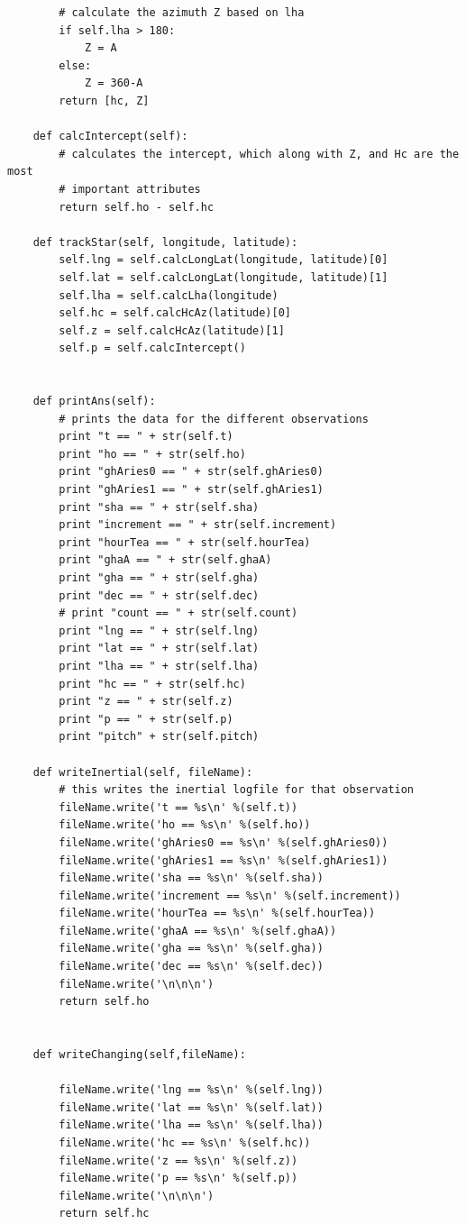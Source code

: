 \documentclass[12pt,a4paper]{book}
\begin{document}
\begin{appendices}
\begin{verbatim}
        # calculate the azimuth Z based on lha
        if self.lha > 180:
            Z = A
        else:
            Z = 360-A
        return [hc, Z]

    def calcIntercept(self):
        # calculates the intercept, which along with Z, and Hc are the most 
        # important attributes
        return self.ho - self.hc

    def trackStar(self, longitude, latitude):
        self.lng = self.calcLongLat(longitude, latitude)[0]
        self.lat = self.calcLongLat(longitude, latitude)[1]
        self.lha = self.calcLha(longitude)
        self.hc = self.calcHcAz(latitude)[0]
        self.z = self.calcHcAz(latitude)[1]
        self.p = self.calcIntercept() 


    def printAns(self):
        # prints the data for the different observations
        print "t == " + str(self.t)
        print "ho == " + str(self.ho)
        print "ghAries0 == " + str(self.ghAries0)
        print "ghAries1 == " + str(self.ghAries1)
        print "sha == " + str(self.sha)
        print "increment == " + str(self.increment)
        print "hourTea == " + str(self.hourTea)
        print "ghaA == " + str(self.ghaA)
        print "gha == " + str(self.gha)
        print "dec == " + str(self.dec)
        # print "count == " + str(self.count)
        print "lng == " + str(self.lng)
        print "lat == " + str(self.lat)
        print "lha == " + str(self.lha)
        print "hc == " + str(self.hc)
        print "z == " + str(self.z)
        print "p == " + str(self.p)
        print "pitch" + str(self.pitch)
    
    def writeInertial(self, fileName):
        # this writes the inertial logfile for that observation 
        fileName.write('t == %s\n' %(self.t))
        fileName.write('ho == %s\n' %(self.ho))
        fileName.write('ghAries0 == %s\n' %(self.ghAries0))
        fileName.write('ghAries1 == %s\n' %(self.ghAries1))
        fileName.write('sha == %s\n' %(self.sha))
        fileName.write('increment == %s\n' %(self.increment))
        fileName.write('hourTea == %s\n' %(self.hourTea))
        fileName.write('ghaA == %s\n' %(self.ghaA))
        fileName.write('gha == %s\n' %(self.gha))
        fileName.write('dec == %s\n' %(self.dec))
        fileName.write('\n\n\n')
        return self.ho
    
    
    def writeChanging(self,fileName):
        
        fileName.write('lng == %s\n' %(self.lng))
        fileName.write('lat == %s\n' %(self.lat))
        fileName.write('lha == %s\n' %(self.lha))
        fileName.write('hc == %s\n' %(self.hc))
        fileName.write('z == %s\n' %(self.z))
        fileName.write('p == %s\n' %(self.p))
        fileName.write('\n\n\n')
        return self.hc


\end{verbatim}
\end{appendices}
\end{document}
